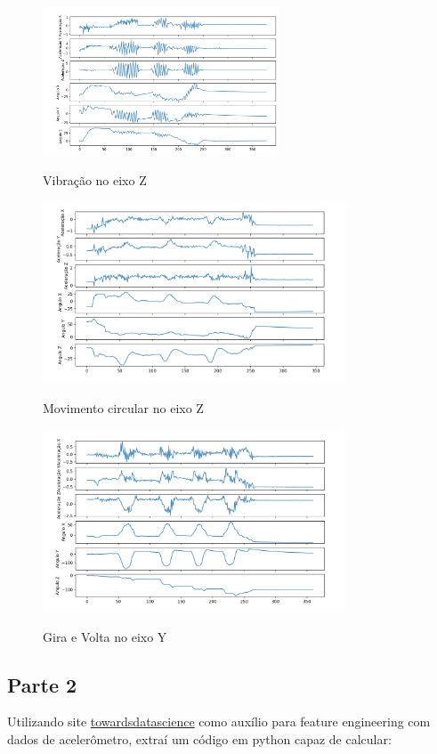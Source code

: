 \begin{figure}[H]
    \center
    \includegraphics[width=7cm]{images/VibracaoZ.png}
    \label{img3}
    \caption{Vibração no eixo Z}
\end{figure}

\begin{figure}[H]
    \center
    \includegraphics[width=9cm]{images/CirculoZ.png}
    \label{img4}
    \caption{Movimento circular no eixo Z}
\end{figure}

\begin{figure}[H]
    \center
    \includegraphics[width=9cm]{images/GiraeVoltaY.png}
    \label{img5}
    \caption{ Gira e Volta no eixo Y }
\end{figure}


\subsection*{Parte 2}

Utilizando site \hyperlink{https://towardsdatascience.com/feature-engineering-on-time-series-data-transforming-signal-data-of-a-smartphone-accelerometer-for-72cbe34b8a60}{towardsdatascience}
como auxílio para feature engineering com dados de acelerômetro, extraí um código em python capaz de calcular:


